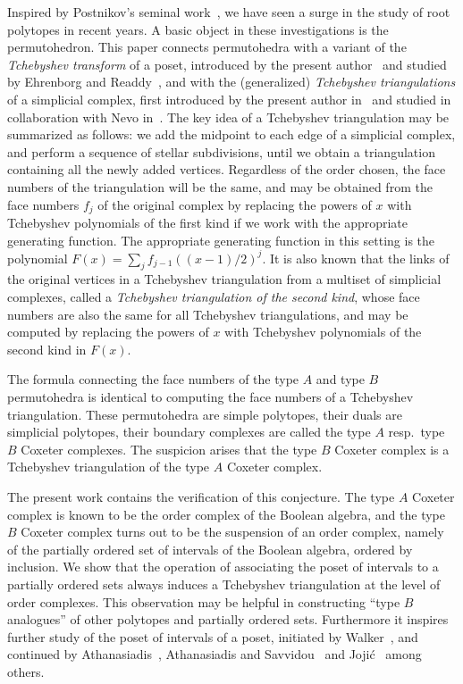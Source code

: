 \documentclass[reqno,12pt]{amsart}
\numberwithin{equation}{section}
\newcommand{\0}{\widehat{0}}
\newcommand{\1}{\widehat{1}}
\newcommand{\2}{\widehat{2}}
\begin{document}
Inspired by Postnikov's seminal work~\cite{Postnikov}, we have seen a
surge in the study of root polytopes in recent years. A basic object in
these investigations is the permutohedron. This paper connects
permutohedra with a variant of the 
{\em Tchebyshev transform} of a poset, introduced by the present
author~\cite{Hetyei-tch,Hetyei-mfp} and studied by Ehrenborg and
Readdy~\cite{Ehrenborg-Readdy-Tch}, and with the (generalized)
{\em Tchebyshev triangulations} of a simplicial complex, first introduced by
the present author in~\cite{Hetyei-tt} and studied in collaboration with
Nevo in~\cite{Hetyei-Nevo}. The key idea of a Tchebyshev triangulation
may be summarized as follows: we add the midpoint to each edge of a
simplicial complex, and perform a sequence of stellar subdivisions,
until we obtain a triangulation containing all the newly added
vertices. Regardless of the order chosen, the face numbers of the
triangulation will be the same, and may be obtained from the face
numbers $f_j$ of the original complex by replacing the powers of $x$ with
Tchebyshev polynomials of the first kind if we work with the appropriate
generating function. The appropriate generating function in this setting
is the polynomial $F(x)=\sum_j f_{j-1} ((x-1)/2)^j$. It is also known that
the links of the original vertices in a Tchebyshev triangulation from a
multiset of simplicial complexes, called a {\em Tchebyshev triangulation
  of the second kind}, whose face numbers are also the same for all
Tchebyshev triangulations, and may be computed by replacing the powers
of $x$ with Tchebyshev polynomials of the second kind in $F(x)$.

The formula connecting the face numbers of the
type $A$ and type $B$ permutohedra is identical to computing the face
numbers of a Tchebyshev triangulation. These permutohedra are
simple polytopes, their duals are simplicial polytopes, their
boundary complexes are called the type $A$ resp.\ type $B$
  Coxeter complexes. The suspicion
arises that the type $B$ Coxeter complex is a Tchebyshev
triangulation of the type $A$ Coxeter complex. 

The present work contains the verification of this conjecture. The type
$A$ Coxeter complex is known to be the order complex of the Boolean
algebra, and the type $B$ Coxeter complex turns out to be the suspension
of an order complex, namely of the partially ordered set of intervals
of the Boolean algebra, ordered by inclusion.  We show that the operation of
associating the poset of intervals to a partially ordered sets 
always induces a Tchebyshev triangulation at the level of order
complexes. This observation may be helpful in constructing ``type $B$
analogues'' of other polytopes and partially ordered sets. Furthermore
it inspires further study of the poset of intervals of a poset,
initiated by Walker~\cite{Walker}, and continued by
Athanasiadis~\cite{Athanasiadis}, Athanasiadis and
Savvidou~\cite{Athanasiadis-Savvidou} and
Joji\'{c}~\cite{Jojic} among others. 
\end{document}
